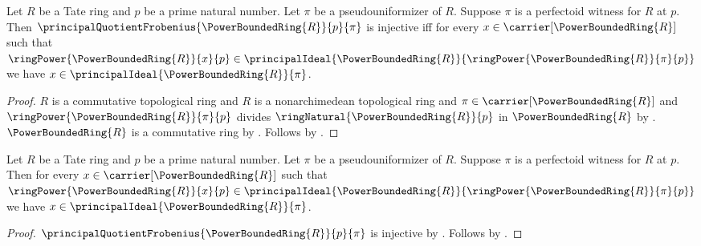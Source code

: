 \begin{theorem}\label{perfectoid_witness_frobenius_injective_iff}
    Let $R$ be a Tate ring and $p$ be a prime natural number.
    Let $\pi$ be a pseudouniformizer of $R$.
    Suppose $\pi$ is a perfectoid witness for $R$ at $p$.
    Then $\principalQuotientFrobenius{\PowerBoundedRing{R}}{p}{\pi}$
        is injective iff for every
        $x\in\carrier[\PowerBoundedRing{R}]$ such that
            $\ringPower{\PowerBoundedRing{R}}{x}{p}
                \in\principalIdeal{\PowerBoundedRing{R}}{
                    \ringPower{\PowerBoundedRing{R}}{\pi}{p}}$
        we have $x\in\principalIdeal{\PowerBoundedRing{R}}{\pi}$.
\end{theorem}
\begin{proof}
    $R$ is a commutative topological ring and
        $R$ is a nonarchimedean topological ring and
        $\pi\in\carrier[\PowerBoundedRing{R}]$ and
        $\ringPower{\PowerBoundedRing{R}}{\pi}{p}$ divides
            $\ringNatural{\PowerBoundedRing{R}}{p}$ in
            $\PowerBoundedRing{R}$ by
        .
    $\PowerBoundedRing{R}$ is a commutative ring by
        .
    Follows by .
\end{proof}

\begin{theorem}\label{perfectoid_witness_frobenius_kernel}
    Let $R$ be a Tate ring and $p$ be a prime natural number.
    Let $\pi$ be a pseudouniformizer of $R$.
    Suppose $\pi$ is a perfectoid witness for $R$ at $p$.
    Then for every $x\in\carrier[\PowerBoundedRing{R}]$ such that
        $\ringPower{\PowerBoundedRing{R}}{x}{p}
            \in\principalIdeal{\PowerBoundedRing{R}}{
                \ringPower{\PowerBoundedRing{R}}{\pi}{p}}$
        we have $x\in\principalIdeal{\PowerBoundedRing{R}}{\pi}$.
\end{theorem}
\begin{proof}
    $\principalQuotientFrobenius{\PowerBoundedRing{R}}{p}{\pi}$
        is injective by
        .
    Follows by .
\end{proof}

